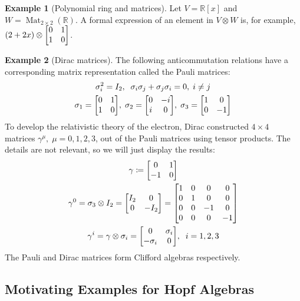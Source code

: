\documentclass{article}
\theoremstyle{definition}
\newtheorem*{Example*}{Example}
\theoremstyle{remark}
\theoremstyle{underline}
\theoremstyle{underline}
\DeclareMathOperator{\Mat}{Mat}
\begin{document}
	\begin{Example*}[Polynomial ring and matrices] 
		Let $ V = \mathbb{R}[x]$ and $ W = \Mat_{2\times 2}(\mathbb{R})$. A formal expression of an element in $V \otimes W $ is, for example, $(2 + 2x) \otimes \mqty[0 & 1 \\ 1 & 0]$.
	\end{Example*}
	
	\begin{Example*}[Dirac matrices]
		The following anticommutation relations have a corresponding matrix representation called the Pauli matrices:
		\begin{gather*}
		\sigma_i^2 = I_2, \;\; \sigma_i \sigma_j + \sigma_j\sigma_i = 0, \; i \neq j \\
		\sigma_1 = \mqty[0 & 1 \\ 1 & 0],\; \sigma_2 = \mqty[0 & -i \\ i & 0],\; \sigma_3 = \mqty[1 & 0 \\ 0 & -1]
		\end{gather*}
		To develop the relativistic theory of the electron, Dirac constructed $4 \times 4$ matrices $\gamma^\mu,\; \mu = 0,1,2,3$, out of the Pauli matrices using tensor products. The details are not relevant, so we will just display the results:
		\begin{gather*}
		\gamma \coloneqq \mqty[0 & 1 \\ -1 & 0] \\
		\gamma^{0} = \sigma_3 \otimes I_2 = \mqty[I_2 & 0 \\ 0 & -I_2] = \mqty[1 & 0 & 0 & 0 \\ 0 & 1 & 0 & 0 \\ 0 & 0 & -1 & 0 \\ 0 & 0 & 0 & -1] \\
		\gamma^{i} = \gamma \otimes \sigma_i = \mqty[0 & \sigma_i \\ -\sigma_i & 0],\;\; i = 1,2,3
		\end{gather*}
		The Pauli and Dirac matrices form Clifford algebras respectively.
	\end{Example*}
	
	\subsection{Motivating Examples for Hopf Algebras}
	
\end{document}
